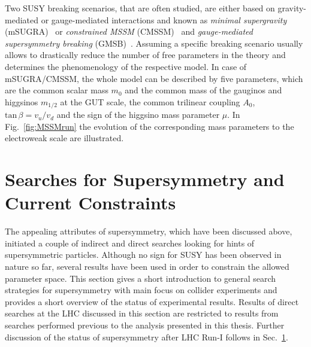Two SUSY breaking scenarios, that are often studied, are either based on gravity-mediated or gauge-mediated interactions and known as \textit{minimal supergravity} (mSUGRA)~\cite{Chamseddine:1982jx, AlvarezGaume:1983gj} or \textit{constrained MSSM} (CMSSM)~\cite{Kane:1993td, Baer:2002gm} and \textit{gauge-mediated supersymmetry breaking} (GMSB)~\cite{Dine:1981gu, AlvarezGaume:1981wy}. Assuming a specific breaking scenario usually allows to drastically reduce the number of free parameters in the theory and determines the phenomenology of the respective model. In case of mSUGRA/CMSSM, the whole model can be described by five parameters, which are the common scalar mass $m_0$ and the common mass of the gauginos and higgsinos $m_{1/2}$ at the GUT scale, the common trilinear coupling $A_0$, $\mathrm{tan} \, \beta = v_u/v_d$ and the sign of the higgsino mass parameter $\mu$. In Fig.~\ref{fig:MSSMrun} the evolution of the corresponding mass parameters to the electroweak scale are illustrated.  

\section{Searches for Supersymmetry and Current Constraints}
\label{sec:susy_status}
The appealing attributes of supersymmetry, which have been discussed above, initiated a couple of indirect and direct searches looking for hints of supersymmetric particles. Although no sign for SUSY has been observed in nature so far, several results have been used in order to constrain the allowed parameter space. This section gives a short introduction to general search strategies for supersymmetry with main focus on collider experiments and provides a short overview of the status of experimental results. Results of direct searches at the LHC discussed in this section are restricted to results from searches performed previous to the analysis presented in this thesis. Further discussion of the status of supersymmetry after LHC Run-I follows in Sec.~\ref{sec:susy_status}.  

